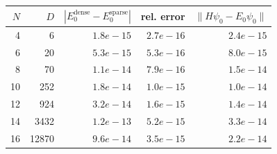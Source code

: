 \begin{tabular}{rrrrr}
\toprule
$N$ & $D$ & $|E_0^{\text{dense}} - E_0^{\text{sparse}}|$ & rel. error & $\|H\psi_0 - E_0\psi_0\|$ \\
\midrule
4 & 6 & $1.8e-15$ & $2.7e-16$ & $2.4e-15$ \\
6 & 20 & $5.3e-15$ & $5.3e-16$ & $8.0e-15$ \\
8 & 70 & $1.1e-14$ & $7.9e-16$ & $1.5e-14$ \\
10 & 252 & $1.8e-14$ & $1.0e-15$ & $1.0e-14$ \\
12 & 924 & $3.2e-14$ & $1.6e-15$ & $1.4e-14$ \\
14 & 3432 & $1.2e-13$ & $5.2e-15$ & $3.3e-14$ \\
16 & 12870 & $9.6e-14$ & $3.5e-15$ & $2.2e-14$ \\
\bottomrule
\end{tabular}
